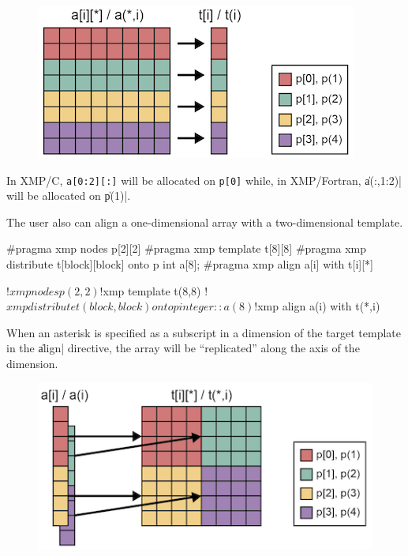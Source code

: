 \begin{figure}
  \centering
  \includegraphics{figs/collapse.png}
\end{figure}

In XMP/C, {\tt a[0:2][:]} will be allocated on {\tt p[0]} while, in
XMP/Fortran, \|a(:,1:2)| will be allocated on \|p(1)|.


The user also can align a one-dimensional array with a two-dimensional
template.

\begin{XCexample}
#pragma xmp nodes p[2][2]
#pragma xmp template t[8][8]
#pragma xmp distribute t[block][block] onto p
int a[8];
#pragma xmp align a[i] with t[i][*]
\end{XCexample}

\begin{XFexample}
!$xmp nodes p(2,2)
!$xmp template t(8,8)
!$xmp distribute t(block,block) onto p
integer :: a(8)
!$xmp align a(i) with t(*,i)
\end{XFexample}

When an asterisk is specified as a subscript in a dimension of the
target template in the \|align| directive, the array will be
``replicated'' along the axis of the dimension.

\begin{figure}
  \centering
  \includegraphics{figs/replicate.png}
\end{figure}

